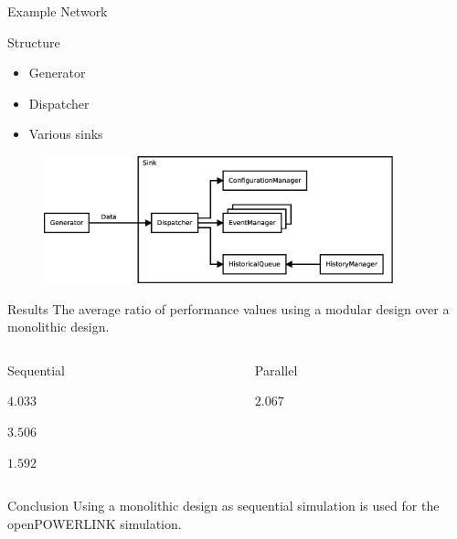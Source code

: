 \begin{frame}{Example Network}
    \begin{block}{Structure}
        \begin{multicols}{3}
            \begin{itemize}
                \item Generator
                \item Dispatcher
                \item Various sinks
            \end{itemize}
        \end{multicols}
    \end{block}
    
    \begin{figure}
        \includegraphics[width=0.9\textwidth]{../../thesis/images/design_test_network.eps}
    \end{figure}
\end{frame}

\begin{frame}{Results}
    The average ratio of performance values using a modular design over a monolithic design.
    \begin{columns}
        \begin{column}{0.48\textwidth}
            \begin{block}{Sequential\strut}
        \begin{description}
            \item[runtime] $4.033$
            \item[created events] $3.506$
            \item[real-time] $1.592$
        \end{description}
            \end{block}
        \end{column}
        \begin{column}{0.48\textwidth}
            \begin{block}{Parallel\strut}
                \begin{description}
                    \item[runtime] $2.067$
                \end{description}
            \end{block}
        \end{column}
    \end{columns}
    
    \begin{block}{Conclusion}
        Using a monolithic design as sequential simulation is used for the openPOWERLINK simulation.
    \end{block}
    
\end{frame}